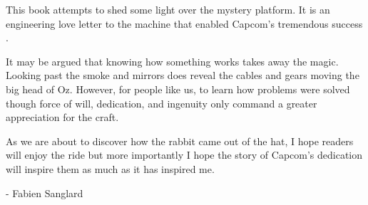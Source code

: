 This book attempts to shed some light over the mystery platform. It is an engineering love letter to the machine that enabled Capcom's tremendous success . 

It may be argued that knowing how something works takes away the magic. Looking past the smoke and mirrors does reveal the cables and gears moving the big head of Oz. However, for people like us, to learn how problems were solved though force of will, dedication, and ingenuity only command a greater appreciation for the craft.

As we are about to discover how the rabbit came out of the hat, I hope readers will enjoy the ride but more importantly I hope the story of Capcom's dedication will inspire them as much as it has inspired me. 

- Fabien Sanglard